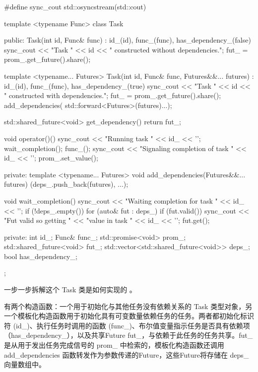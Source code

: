 \begin{cpp}
#define sync_cout std::osyncstream(std::cout)

template <typename Func>
class Task {
    public:
    Task(int id, Func& func)
        : id_(id), func_(func), has_dependency_(false) {
        sync_cout << "Task " << id
        << " constructed without dependencies.\n";
        fut_ = prom_.get_future().share();
    }

    template <typename... Futures>
    Task(int id, Func& func, Futures&&... futures)
        : id_(id), func_(func), has_dependency_(true) {
        sync_cout << "Task " << id
        << " constructed with dependencies.\n";
        fut_ = prom_.get_future().share();
        add_dependencies(
        std::forward<Futures>(futures)...);
    }

    std::shared_future<void> get_dependency() {
        return fut_;
    }

    void operator()() {
        sync_cout << "Running task " << id_ << '\n';
        wait_completion();
        func_();
        sync_cout << "Signaling completion of task "
                  << id_ << '\n';
        prom_.set_value();
    }

private:
    template <typename... Futures>
    void add_dependencies(Futures&&... futures) {
        (deps_.push_back(futures), ...);
    }

    void wait_completion() {
        sync_cout << "Waiting completion for task "
        << id_ << '\n';
        if (!deps_.empty()) {
            for (auto& fut : deps_) {
                if (fut.valid()) {
                    sync_cout << "Fut valid so getting "
                              << "value in task "
                              << id_ << '\n';
                    fut.get();
                }
            }
        }
    }

private:
    int id_;
    Func& func_;
    std::promise<void> prom_;
    std::shared_future<void> fut_;
    std::vector<std::shared_future<void>> deps_;
    bool has_dependency_;
};
\end{cpp}

一步一步拆解这个 Task 类是如何实现的 。

有两个构造函数：一个用于初始化与其他任务没有依赖关系的 Task 类型对象，另一个模板化构造函数用于初始化具有可变数量依赖任务的任务。两者都初始化标识符 (id\_)、执行任务时调用的函数 (func\_)、布尔值变量指示任务是否具有依赖项（has\_dependency\_），以及共享Future fut\_，与依赖于此任务的任务共享。fut\_ 是从用于发出任务完成信号的 prom\_ 中检索的，模板化构造函数还调用 add\_dependencies 函数转发作为参数传递的Future，这些Future将存储在 deps\_ 向量数组中。

